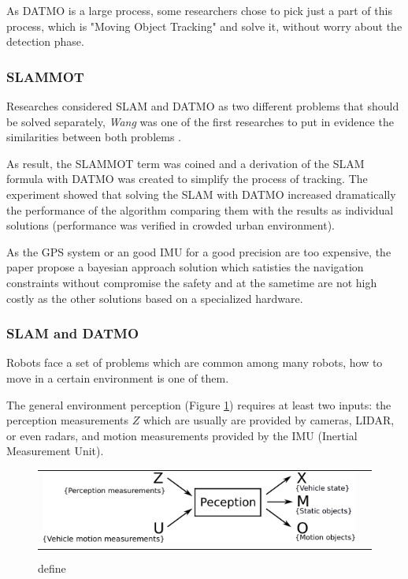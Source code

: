 As DATMO is a large process, some researchers chose to pick just a part of this process, which is "Moving Object Tracking" and solve it, without worry about the detection phase.

\subsubsection{SLAMMOT}

Researches considered SLAM and DATMO as two different problems that should be solved separately, \textit{Wang} was one of the first researches to put in evidence the similarities between both problems \cite{Wang03onlinesimultaneous}.

As result, the SLAMMOT term was coined and a derivation of the SLAM formula with DATMO was created to simplify the process of tracking. The experiment showed that solving the SLAM with DATMO increased dramatically the performance of the algorithm comparing them with the results as individual solutions (performance was verified in crowded urban environment).

As the GPS system or an good IMU for a good precision are too expensive, the paper propose a bayesian approach solution which satisties the navigation constraints without compromise the safety and at the sametime are not high costly as the other solutions based on a specialized hardware.

\subsubsection{SLAM and DATMO}

Robots face a set of problems which are common among many robots, how to move in a certain environment is one of them.

The general environment perception (Figure \ref{fig:perception:cycle}) requires at least two inputs: the perception measurements $Z$ which are usually are provided by cameras, LIDAR, or even radars, and motion measurements provided by the IMU (Inertial Measurement Unit).

\begin{figure}[H]
   \centering
     \begin{tabular}{lr}
       \includegraphics[scale=0.5]{img/fig:perception:cycle}
     \end{tabular}
   \caption{define}
   \label{fig:perception:cycle}
 \end{figure}


